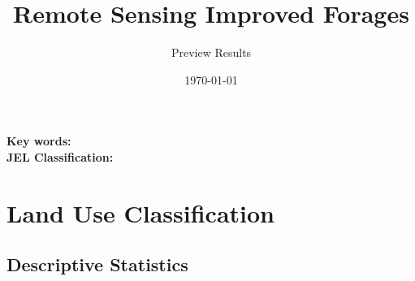 \documentclass[10pt,a4paper,onecolumn]{article}
\title{Remote Sensing Improved Forages}
\author{Preview Results}
\date{\today}
\begin{document}
\maketitle

\thispagestyle{empty} %





\begin{abstract}
\noindent \end{abstract}




\medskip

\begin{flushleft}
  {\bf Key words: }         \\
  {\bf JEL Classification: }
\end{flushleft}

\pagebreak
\doublespacing



 \pagebreak
 \setcounter{page}{1} 
 \setcounter{footnote}{0} 
 \setcounter{section}{0}
\setcounter{figure}{0}
\setcounter{table}{0}
\setcounter{equation}{0}
\makeatletter 
\renewcommand{\thefigure}{\@arabic\c@figure}
\renewcommand{\thetable}{\@arabic\c@table}
\renewcommand{\thefootnote}{\arabic{footnote}}
 \renewcommand{\theequation}{\arabic{equation}}


\pagebreak  
\tableofcontents

\pagebreak
\listoffigures
\pagebreak
\listoftables




\section{Land Use Classification}

\subsection{Descriptive Statistics}
\end{document}
